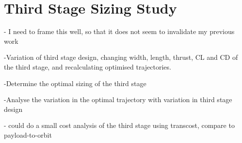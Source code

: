 
\chapter{Third Stage Sizing Study}

- I need to frame this well, so that it does not seem to invalidate my previous work

-Variation of third stage design, changing width, length, thrust, CL and CD of the third stage, and recalculating optimised trajectories.

-Determine the optimal sizing of the third stage 

-Analyse the variation in the optimal trajectory with variation in third stage design



- could do a small cost analysis of the third stage using transcost, compare to payload-to-orbit

